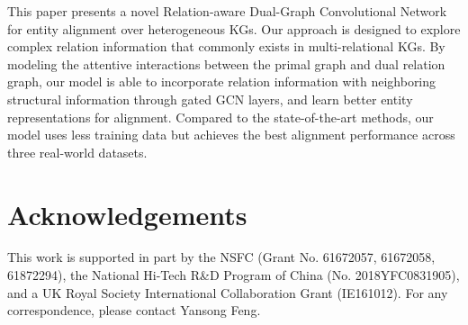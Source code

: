 \documentclass{article}
\begin{document}
This paper presents a novel Relation-aware Dual-Graph Convolutional Network for entity alignment over heterogeneous KGs. Our approach is designed to explore complex relation information that commonly exists in multi-relational KGs. 
By modeling the attentive interactions between the primal graph and dual relation graph, our model is able to incorporate relation information with neighboring structural information through gated GCN layers, and learn better entity representations for alignment. Compared to the state-of-the-art methods, our model uses less training data but achieves the best alignment performance across three real-world datasets.


\section*{Acknowledgements}
This work is supported in part by the NSFC (Grant No. 61672057, 61672058, 61872294), the National Hi-Tech R\&D Program of China (No. 2018YFC0831905), and a UK Royal Society International Collaboration Grant (IE161012). For any correspondence, please contact Yansong Feng.




\end{document}
